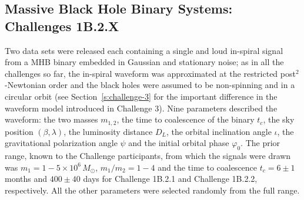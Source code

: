 \documentclass{iopart}
\begin{document}
\subsection{Massive Black Hole Binary Systems: Challenges 1B.2.X}

Two data sets were released each containing a single and loud in-spiral signal from a MHB binary embedded in Gaussian and stationary noise; as in all the challenges so far, the in-spiral waveform was approximated at the restricted post$^2$-Newtonian order and the black holes were assumed to be non-spinning and in a circular orbit (see Section~\ref{s:challenge-3} for the important difference in the waveform model introduced in Challenge 3). Nine parameters described the waveform: the two masses $m_{1,2}$, the time to coalescence of the binary $t_c$, the sky position $(\beta,\lambda)$, the luminosity distance $D_L$, the orbital inclination angle $\iota$, the gravitational polarization angle $\psi$ and the initial orbital phase $\varphi_0$.  The prior range, known to the Challenge participants, from which the signals were drawn was $m_1 = 1-5 \times 10^6\,M_{\odot}$, $m_1/m_2 = 1-4$ and the time to coalescence $t_c = 6\pm 1$ months and $400\pm40$ days for Challenge 1B.2.1 and Challenge 1B.2.2, respectively. All the other parameters were selected randomly from the full range.
\end{document}
